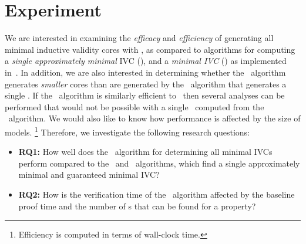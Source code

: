 \section{Experiment}
\label{sec:experiment}

\newcommand{\takeaway}[1]{
\vspace{6pt}
\noindent\fbox{\parbox{\textwidth}{#1}}
\vspace{6pt}
}
We are interested in examining the {\em efficacy} and {\em efficiency} of generating all minimal inductive validity cores with \aivcalg , as compared to algorithms for computing a {\em single approximately minimal} IVC (\ucalg), and a {\em minimal IVC} (\ucbfalg) as implemented in~\cite{Ghass16}.  In addition, we are also interested in determining whether the \aivcalg\ algorithm generates {\em smaller} cores than are generated by the \ucbfalg\ algorithm that generates a single \mivc.  If the \aivcalg\ algorithm is similarly efficient to \ucbfalg\ then several analyses can be performed that would not be possible with a single \mivc\ computed from the \ucbfalg\ algorithm.  We would also like to know how performance is affected by the size of models.
\footnote{Efficiency is computed in terms of wall-clock time.} 
Therefore, we investigate the following research questions:
\begin{itemize}
  \item \textbf{RQ1:} How well does the \aivcalg ~algorithm for determining all minimal IVCs perform compared to the \ucalg ~and \ucbfalg ~algorithms, which find a single approximately minimal and guaranteed minimal IVC?
  \item \textbf{RQ2:} How is the verification time of the \aivcalg ~algorithm affected by the baseline proof time and the number of \mivc s that can be found for a property?
%
\end{itemize}


